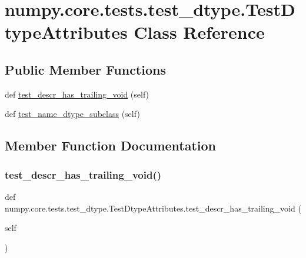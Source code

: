\hypertarget{classnumpy_1_1core_1_1tests_1_1test__dtype_1_1TestDtypeAttributes}{}\section{numpy.\+core.\+tests.\+test\+\_\+dtype.\+Test\+Dtype\+Attributes Class Reference}
\label{classnumpy_1_1core_1_1tests_1_1test__dtype_1_1TestDtypeAttributes}
\subsection*{Public Member Functions}
\begin{DoxyCompactItemize}
\item 
def \hyperlink{classnumpy_1_1core_1_1tests_1_1test__dtype_1_1TestDtypeAttributes_a43a84cc535a38dcbcf250f192cce0c2d}{test\+\_\+descr\+\_\+has\+\_\+trailing\+\_\+void} (self)
\item 
def \hyperlink{classnumpy_1_1core_1_1tests_1_1test__dtype_1_1TestDtypeAttributes_ac231ab0483c4928b2a5fc9bc8c4b38a3}{test\+\_\+name\+\_\+dtype\+\_\+subclass} (self)
\end{DoxyCompactItemize}


\subsection{Member Function Documentation}
\mbox{\label{classnumpy_1_1core_1_1tests_1_1test__dtype_1_1TestDtypeAttributes_a43a84cc535a38dcbcf250f192cce0c2d}} 
\subsubsection{\texorpdfstring{test\+\_\+descr\+\_\+has\+\_\+trailing\+\_\+void()}{test\_descr\_has\_trailing\_void()}}
{\footnotesize\ttfamily def numpy.\+core.\+tests.\+test\+\_\+dtype.\+Test\+Dtype\+Attributes.\+test\+\_\+descr\+\_\+has\+\_\+trailing\+\_\+void (\begin{DoxyParamCaption}\item[{}]{self }\end{DoxyParamCaption})}

